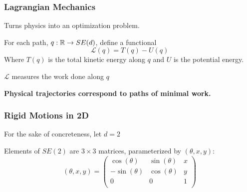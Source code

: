\documentclass{beamer}
\begin{document}
\begin{frame}
\frametitle{Lagrangian Mechanics}
Turns physics into an optimization problem.

For each path, $q : \mathbb{R} \to SE(d)$, define a functional
\[ \mathcal{L}(q) = T(q) - U(q) \]
Where $T(q)$ is the total kinetic energy along $q$ and $U$ is the potential energy.

$\mathcal{L}$ measures the work done along $q$

\bf{Physical trajectories correspond to paths of minimal work.}

\end{frame}


\begin{frame}
\frametitle{Rigid Motions in 2D}
For the sake of concreteness, let $d = 2$

Elements of $SE(2)$ are $3 \times 3$ matrices, parameterized by $(\theta, x, y)$:
\[ (\theta, x, y) = \left ( \begin{array}{ccc}
\cos(\theta) & \sin(\theta) & x \\
-\sin(\theta) & \cos(\theta) & y \\
0 & 0 & 1 \\
\end{array} \right) \]


\end{frame}
\end{document}
